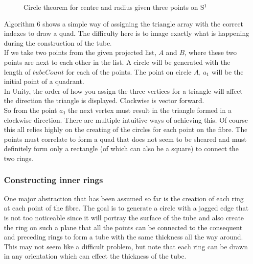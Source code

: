 \documentclass[12pt]{article} %
\begin{document}
\begin{flushleft}
\begin{figure}[H] %
\caption{Circle theorem for centre and radius given three points on S$^{1}$}
\label{fig:speciation}
\end{figure}

Algorithm 6 shows a simple way of assigning the triangle array with the correct indexes to draw a quad. The difficulty here is to image exactly what is happening during the construction of the tube.\\
If we take two points from the given projected list, $A$ and $B$, where these two points are next to each other in the list. A circle will be generated with the length of $tubeCount$ for each of the points. The point on circle $A$, $a_{1}$ will be the initial point of a quadrant. \\
In Unity, the order of how you assign the three vertices for a triangle will affect the direction the triangle is displayed. Clockwise is vector forward.\\
So from the point $a_{1}$ the next vertex must result in the triangle formed in a clockwise direction. There are multiple intuitive ways of achieving this. Of course this all relies highly on the creating of the circles for each point on the fibre. The points must correlate to form a quad that does not seem to be sheared and must definitely form only a rectangle (of which can also be a square) to connect the two rings.
\subsubsection{Constructing inner rings} %
One major abstraction that has been assumed so far is the creation of each ring at each point of the fibre. The goal is to generate a circle with a jagged edge that is not too noticeable since it will portray the surface of the tube and also create the ring on such a plane that all the points can be connected to the consequent and preceding rings to form a tube with the same thickness all the way around. This may not seem like a difficult problem, but note that each ring can be drawn in any orientation which can effect the thickness of the tube.\\


\end{flushleft}
\end{document}
